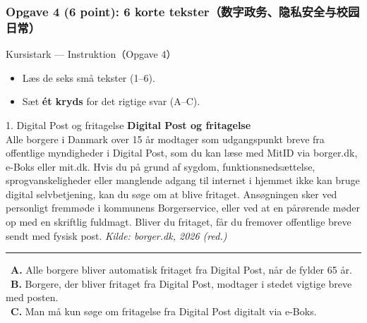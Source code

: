 \subsubsection*{Opgave 4 (6 point): 6 korte tekster（数字政务、隐私安全与校园日常）}

\begin{emailbox}{Kursistark --- Instruktion（Opgave 4）}
\begin{itemize}
  \item Læs de seks små tekster (1--6).
  \item Sæt \textbf{ét kryds} for det rigtige svar (A--C).
\end{itemize}
\end{emailbox}

\begin{emailbox}{1. Digital Post og fritagelse}
\textbf{Digital Post og fritagelse}\\
Alle borgere i Danmark over 15 år modtager som udgangspunkt breve fra offentlige myndigheder i Digital Post, som du kan læse med MitID via borger.dk, e-Boks eller mit.dk. Hvis du på grund af sygdom, funktionsnedsættelse, sprogvanskeligheder eller manglende adgang til internet i hjemmet ikke kan bruge digital selvbetjening, kan du søge om at blive fritaget. Ansøgningen sker ved personligt fremmøde i kommunens Borgerservice, eller ved at en pårørende møder op med en skriftlig fuldmagt. Bliver du fritaget, får du fremover offentlige breve sendt med fysisk post.
\hfill {\small\textit{Kilde: borger.dk, 2026 (red.)}}

\vspace{0.3em}
\hrule
\vspace{0.3em}
\small
\fbox{\phantom{X}}\ \textbf{A.} Alle borgere bliver automatisk fritaget fra Digital Post, når de fylder 65 år.\\[0.25em]
\fbox{\phantom{X}}\ \textbf{B.} Borgere, der bliver fritaget fra Digital Post, modtager i stedet vigtige breve med posten.\\[0.25em]
\fbox{\phantom{X}}\ \textbf{C.} Man må kun søge om fritagelse fra Digital Post digitalt via e-Boks.
\end{emailbox}

